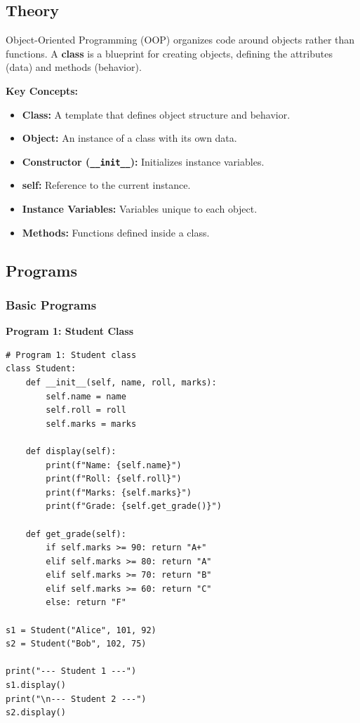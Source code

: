 \documentclass[12pt,a4paper]{article}
\begin{document}
\subsection{Theory}

Object-Oriented Programming (OOP) organizes code around objects rather than functions. A \textbf{class} is a blueprint for creating objects, defining the attributes (data) and methods (behavior).

\textbf{Key Concepts:}
\begin{itemize}
  \item \textbf{Class:} A template that defines object structure and behavior.
  \item \textbf{Object:} An instance of a class with its own data.
  \item \textbf{Constructor (\texttt{\_\_init\_\_}):} Initializes instance variables.
  \item \textbf{self:} Reference to the current instance.
  \item \textbf{Instance Variables:} Variables unique to each object.
  \item \textbf{Methods:} Functions defined inside a class.
\end{itemize}

\subsection{Programs}
\subsubsection{Basic Programs}

\textbf{Program 1: Student Class}

\begin{lstlisting}
# Program 1: Student class
class Student:
    def __init__(self, name, roll, marks):
        self.name = name
        self.roll = roll
        self.marks = marks

    def display(self):
        print(f"Name: {self.name}")
        print(f"Roll: {self.roll}")
        print(f"Marks: {self.marks}")
        print(f"Grade: {self.get_grade()}")

    def get_grade(self):
        if self.marks >= 90: return "A+"
        elif self.marks >= 80: return "A"
        elif self.marks >= 70: return "B"
        elif self.marks >= 60: return "C"
        else: return "F"

s1 = Student("Alice", 101, 92)
s2 = Student("Bob", 102, 75)

print("--- Student 1 ---")
s1.display()
print("\n--- Student 2 ---")
s2.display()
\end{lstlisting}
\end{document}
